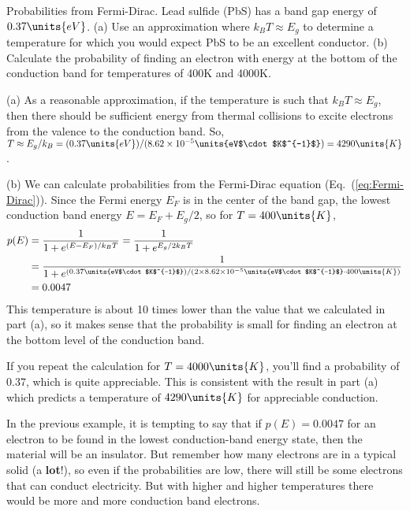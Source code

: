 \begin{example}{Probabilities from Fermi-Dirac.}
\label{ex:FD}
Lead sulfide (PbS) has a band gap energy of $0.37\units{eV}$. (a) Use an
approximation where $k_BT \approx E_g$ to determine a temperature for which you 
would expect PbS to be an excellent conductor.
(b) Calculate the
probability of finding an electron with energy at the bottom of the
conduction band for temperatures of 400K and 4000K.

\begin{solution}
(a) As a reasonable approximation, if the temperature is
such that $k_BT \approx E_g$, then there should be sufficient energy
from thermal collisions to excite electrons from the valence to the conduction
band.  So, 
$T \approx E_g/k_B 
= (0.37\units{eV})/(8.62\times 10^{-5}\units{eV$\cdot$K$^{-1}$})  
= 4290\units{K}$.

(b) We can calculate probabilities from the Fermi-Dirac equation
(Eq.~(\ref{eq:Fermi-Dirac})). Since the Fermi energy $E_F$ is in the center
of the band gap, the lowest conduction band energy $E = E_F + E_g/2$,
so for $T = 400\units{K}$,
\begin{align}
p(E) &= \frac{1}{1+e^{(E-E_F)/k_BT}} = \frac{1}{1+e^{E_g/2k_BT}}\nonumber \\
&= \frac{1}{1+e^{(0.37\units{eV$\cdot$K$^{-1}$})/(2 \times 8.62\times 10^{-5}\units{eV$\cdot$K$^{-1}$}\cdot 400\units{K})}}\nonumber \\ 
&= 0.0047 
\end{align}
This temperature is about 10 times lower than the value that we calculated in
part (a), so it makes sense that the probability is small for finding an 
electron at the bottom level of the conduction band.

If you repeat the calculation for $T = 4000\units{K}$, you'll find 
a probability of 0.37, which is quite appreciable. This is consistent 
with the result in part (a) which predicts a temperature of $4290\units{K}$ 
for appreciable conduction.

\end{solution}
\end{example}

In the previous example, it is tempting to say that if $p(E) = 0.0047$ for
an electron to be found in the lowest conduction-band energy state, then
the material will be an insulator. But remember how many electrons are
in a typical solid (a {\bf lot}!), so even if the probabilities are low,
there will still be some electrons that can conduct electricity. But 
with higher and higher temperatures there
would be more and more conduction band electrons.

